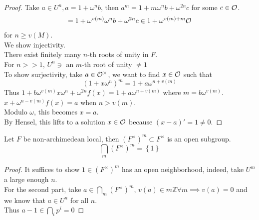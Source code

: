 \documentclass[../main.tex]{subfiles}
\begin{document}
\begin{proof}
Take $a\in U^{n}, a= 1 + \omega^{n} b$, then $a^{m}= 1+ m \omega^{n}b + \omega^{2n}c$ for some $c\in \mathcal{O}$.\\
\begin{align*}
= 1 + \omega^{v( m)} \omega^{n}b + \omega^{2n}c \in 1+ \omega^{v( m) +m}\mathcal{O}
\end{align*}
for $n \geq v( M) $.\\
We show injectivity.\\
There exist finitely many $n$-th roots of unity in $F$.\\
For $n >>1$, $U^{n}\ni $ an $m$-th root of unity $\neq 1$ \\
To show surjectivity, take $a \in \mathcal{O}^{\times}$, we want to find $x\in \mathcal{O}$ such that 
\[ 
	( 1+ x \omega^{n})^{m} = 1+ a \omega^{n + v( m) }
\]
Thus $1+ b \omega^{v( m)}x \omega^{n}+ \omega^{2n} f( x) = 1 + a \omega^{n + v( m) }$ where $m= b \omega^{v( m) }$.\\
$x+ \omega ^{n -v( m) }f( x) =a$ when $n > v( m) $.\\
Modulo $\omega$, this becomes $x =a$.\\
By Hensel, this lifts to a solution $x\in \mathcal{O}$ because $( x-a) ' =1 \neq 0$.
\end{proof}
\begin{crly}
	Let $F$ be non-archimedean local, then $( F^{\times})^{m} \subset F^{\times}$ is an open subgroup.
	\[ 
	\bigcap_{m}  ( F^{\times})^{m}= \left\{ 1 \right\} 
	\]
\end{crly}
\begin{proof}
	It suffices to show $1\in(  F^{\times} )^{m}$ has an open neighborhood, indeed, take $U^{m}$ a large enough $n.$\\
	For the second part, take $a\in \bigcap_m ( F^{\times})^{m}$, $v( a) \in m \mathbb{Z}\forall m\implies v( a) =0$ and we know that $a\in U^{n}$ for all $n$.\\
	Thus $a-1\in \bigcap_i p^{i} =0$ 
\end{proof}
\end{document}
